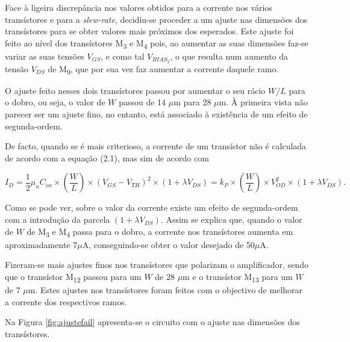 \documentclass[11pt]{article}
\numberwithin{equation}{section}
\begin{document}
Face à ligeira discrepância nos valores obtidos para a corrente nos vários transístores e para a \textit{slew-rate}, decidiu-se proceder a um ajuste nas dimensões dos transístores para se obter valores mais próximos dos esperados. Este ajuste foi feito ao nível dos transístores M\textsubscript{3} e M\textsubscript{4} pois, ao aumentar as suas dimensões faz-se variar as suas tensões $V_{GS}$, e como tal $V_{BIAS_{2}}$, o que resulta num aumento da tensão $V_{DS}$ de M\textsubscript{9}, que por sua vez faz aumentar a corrente daquele ramo.

O ajuste feito nesses dois transístores passou por aumentar o seu rácio $W/L$ para o dobro, ou seja, o valor de $W$ passou de 14 $\mu$m para 28 $\mu$m. À primeira vista não parecer ser um ajuste fino, no entanto, está associado à existência de um efeito de segunda-ordem.

De facto, quando se é mais criterioso, a corrente de um transístor não é calculada de acordo com a equação (2.1), mas sim de acordo com

\vspace{-3mm}
\begin{equation}
I_{D} = \frac{1}{2}\mu_{n}C_{ox}\times \left(\frac{W}{L}\right) \times \left(V_{GS}-V_{TH}\right)^2 \times \left(1+\lambda V_{DS}\right) = k_P \times \left(\frac{W}{L}\right) \times V_{OD}^2 \times \left(1+\lambda V_{DS}\right).
\end{equation}

\vspace{1mm}
Como se pode ver, sobre o valor da corrente existe um efeito de segunda-ordem com a introdução da parcela $\left(1+\lambda V_{DS}\right)$. Assim se explica que, quando o valor de $W$ de M\textsubscript{3} e M\textsubscript{4} passa para o dobro, a corrente nos transístores aumenta em aproximadamente 7$\mu$A, conseguindo-se obter o valor desejado de 50$\mu$A.

Fizeram-se mais ajustes finos nos transístores que polarizam o amplificador, sendo que o transístor M\textsubscript{12} passou para um $W$ de 28 $\mu$m e o transístor M\textsubscript{13} para um $W$ de 7 $\mu$m. Estes ajustes nos transístores foram feitos com o objectivo de melhorar a corrente dos respectivos ramos.

Na Figura \ref{fig:ajustefail} apresenta-se o circuito com o ajuste nas dimensões dos transístores.
\end{document}

